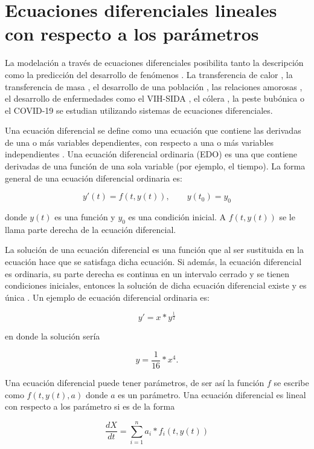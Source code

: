 \section{Ecuaciones diferenciales lineales con respecto a los parámetros}\label{section:differential_equation_lineal_in_params}

La modelación a través de ecuaciones diferenciales posibilita tanto la descripción como la predicción del desarrollo de fenómenos \cite{zill2012first}. La transferencia de calor \cite{p-transferencia-calor}, la transferencia de masa \cite{p-transferencia-masa}, el desarrollo de una población \cite{p-desarrollo-poblacion}, las relaciones amorosas \cite{p-amor}, el desarrollo de enfermedades como el VIH-SIDA \cite{p-desarrollo-vih}, el cólera \cite{p-desarrollo-colera}, la peste bubónica \cite{p-desarrollo-peste} o el COVID-19 \cite{p-desarrollo-covid} se estudian utilizando sistemas de ecuaciones diferenciales.

Una ecuación diferencial se define como una ecuación que contiene las derivadas de una o más variables dependientes, con respecto a una o más variables independientes \cite{gaucel2014learning}. Una ecuación diferencial ordinaria (EDO) es una que contiene derivadas de una función de una sola variable (por ejemplo, el tiempo). La forma general de una ecuación diferencial ordinaria es:

$$y'(t)=f(t, y(t)), \qquad y(t_0) = y_0$$

donde $y(t)$ es una función y $y_0$ es una condición inicial. A $f(t, y(t))$ se le llama parte derecha de la ecuación diferencial.

La solución de una ecuación diferencial es una función que al ser sustituida en la ecuación hace que se satisfaga dicha ecuación. Si además, la ecuación diferencial es ordinaria, su parte derecha es continua en un intervalo cerrado y se tienen condiciones iniciales, entonces la solución de dicha ecuación diferencial existe y es única \cite{zill2012first}. Un ejemplo de ecuación diferencial ordinaria es:

$$y' = x * y^{\frac{1}{2}}$$

en donde la solución sería

$$y = \frac{1}{16} * x^4.$$

Una ecuación diferencial puede tener parámetros, de ser así la función $f$ se escribe como $f(t, y(t), a)$ donde $a$ es un parámetro. Una ecuación diferencial es lineal con respecto a los parámetro si es de la forma

$$\frac{dX}{dt} = \sum_{i=1}^{n} a_i * f_i(t, y(t))$$

